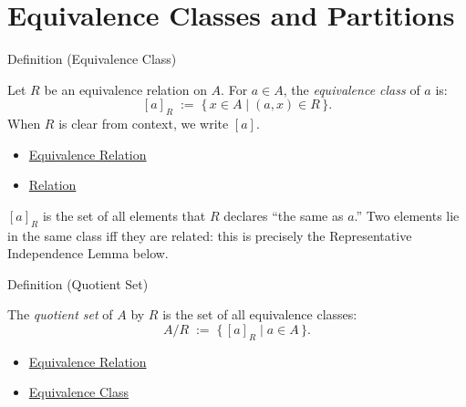 
\section{Equivalence Classes and Partitions}


\begin{definitionbox}{Definition (Equivalence Class)}
\begin{definition}\label{def:equiv-class}
Let $R$ be an equivalence relation on $A$. For $a \in A$, the
\emph{equivalence class} of $a$ is:
\[
[a]_R \;:=\; \{\, x \in A \mid (a,x) \in R \,\}.
\]
When $R$ is clear from context, we write $[a]$.
\end{definition}
\end{definitionbox}

\begin{dependencies}
\begin{itemize}
  \item \hyperref[def:equivalence-rel]{Equivalence Relation}
  \item \hyperref[def:relation]{Relation}
\end{itemize}
\end{dependencies}

\begin{remark*}
$[a]_R$ is the set of all elements that $R$ declares ``the same as $a$.''
Two elements lie in the same class iff they are related: this is precisely
the Representative Independence Lemma below.
\end{remark*}

\begin{definitionbox}{Definition (Quotient Set)}
\begin{definition}\label{def:quotient-set}
The \emph{quotient set} of $A$ by $R$ is the set of all equivalence classes:
\[
A / R \;:=\; \{\, [a]_R \mid a \in A \,\}.
\]
\end{definition}
\end{definitionbox}

\begin{dependencies}
\begin{itemize}
  \item \hyperref[def:equivalence-rel]{Equivalence Relation}
  \item \hyperref[def:equiv-class]{Equivalence Class}
\end{itemize}
\end{dependencies}


